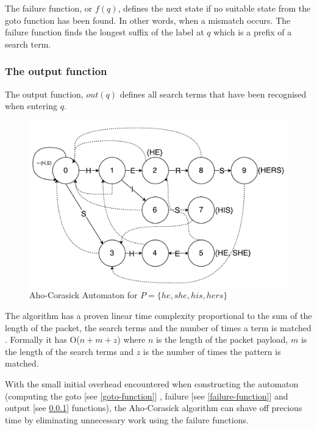 \documentclass{article}
\begin{document}
The failure function, or \(f(q)\), defines the next state if no suitable state from the goto function has been found. In other words, when a mismatch occurs. The failure function finds the longest suffix of the label at \(q\) which is a prefix of a search term.

\subsubsection{The output function} \label{output-function}

The output function, \(out(q)\) defines all search terms that have been recognised when entering \(q\).

\begin{figure}[hbt]
  \label{trie}
  \centering
  \makeatletter
  \includegraphics[width=\textwidth]{images/ac-automaton}
  \caption{Aho-Corasick Automaton for \(P = \{he, she, his, hers\}\)}
\end{figure}

The algorithm has a proven linear time complexity proportional to the sum of the length of the packet, the search terms and the number of times a term is matched \citep{Aho1975}. Formally it has O(\(n + m + z\)) where \(n\) is the length of the packet payload, \(m\) is the length of the search terms and \(z\) is the number of times the pattern is matched.

With the small initial overhead encountered when constructing the automaton (computing the goto [see \ref{goto-function}] , failure [see \ref{failure-function}] and output [see \ref{output-function}] functions), the Aho-Corasick algorithm can shave off precious time by eliminating unnecessary work using the failure functions.
\end{document}
